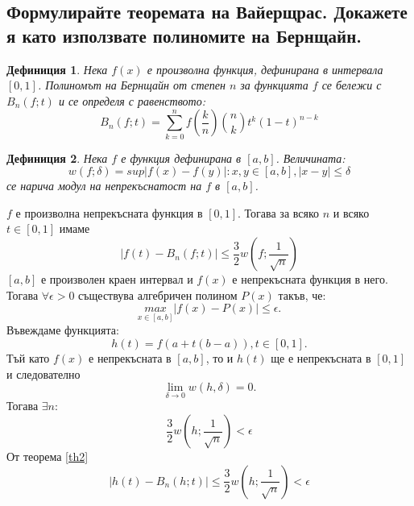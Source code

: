 \documentclass[12pt]{article}
\numberwithin{equation}{subsection}
\newtheorem{definition}{Дефиниция}
\numberwithin{theorem}{subsection}
\numberwithin{definition}{subsection}
\numberwithin{corollary}{subsection}
\begin{document}
\subsection{Формулирайте теоремата на Вайерщрас. Докажете я като използвате полиномите на Бернщайн.}
  \begin{definition}
    Нека $f(x)$ е произволна функция, дефинирана в интервала $[0,1]$. Полиномът на Бернщайн от степен $n$ за функцията $f$ се бележи с $B_n(f;t)$ и се определя с равенството:
    \begin{equation*}
      B_n(f;t)=\sum_{k=0}^{n}f\left(\frac{k}{n}\right)\genfrac(){0pt}{0}{n}{k}t^k(1-t)^{n-k}
    \end{equation*}
  \end{definition}
  \begin{definition}
    Нека $f$  е функция дефинирана в $[a,b]$. Величината:
    \begin{equation*}
      w(f;\delta)=sup{|f(x)-f(y)|:x,y\in[a,b], |x-y|\leq\delta}
    \end{equation*}
    се нарича модул на непрекъснатост на $f $ в $[a,b]$.
  \end{definition}
   $f$ е произволна непрекъсната функция в $[0,1]$. Тогава за всяко $n$ и всяко $t\in[0,1]$ имаме
  \begin{equation}\label{th2}
    |f(t)-B_n(f;t)|\leq\frac{3}{2}w\left(f;\frac{1}{\sqrt n}\right)
  \end{equation}
   $[a,b]$ е произволен краен интервал и $f(x)$ е непрекъсната функция в него. Тогава $\forall\epsilon>0$ съществува алгебричен полином $P(x)$ такъв, че:
  \begin{equation*}
    \underset{x\in[a,b]}{max}|f(x)-P(x)|\leq\epsilon.
  \end{equation*}
  \proof
  Въвеждаме функцията:
  \begin{equation*}
    h(t)=f(a+t(b-a)), t\in[0,1].
  \end{equation*}
  Тъй като $f(x)$ е непрекъсната в $[a,b]$, то и $h(t)$ ще е непрекъсната в $[0,1]$ и следователно
  \begin{equation*}
    \lim_{\delta\to0}w(h,\delta) = 0.
  \end{equation*}
  Тогава $\exists n:$
  \begin{equation*}
    \frac{3}{2}w\left(h;\frac{1}{\sqrt n}\right)<\epsilon
  \end{equation*}
  От теорема \ref{th2}
  \begin{equation*}
    |h(t)-B_n(h;t)|\leq\frac{3}{2}w\left(h;\frac{1}{\sqrt n}\right)<\epsilon
  \end{equation*}
\end{document}
